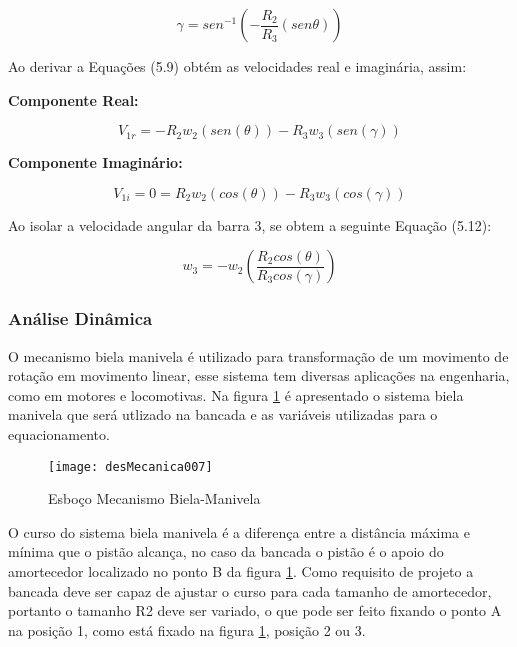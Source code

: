 		\begin{equation}
			\gamma = sen^{-1} ( - \frac{R_{2}}{R_{3}}(sen\theta))
		\end{equation}

		Ao derivar a Equações (5.9) obtém as velocidades real e imaginária, assim:

		\textbf{Componente Real:}

		\begin{equation}
			V_{1r} = -R_{2}w_{2}(sen(\theta)) - R_{3}w_{3}(sen(\gamma))
		\end{equation}

		\textbf{Componente Imaginário:}

		\begin{equation}
			V_{1i} = 0 = R_{2}w_{2}(cos(\theta)) - R_{3}w_{3}(cos(\gamma))
		\end{equation}

		Ao isolar a velocidade angular da barra 3, se obtem a seguinte Equação (5.12):

		\begin{equation}
			w_{3} = - w_{2} (\frac{R_{2}cos(\theta)}{R_{3}cos(\gamma)})
		\end{equation}

	\subsubsection{Análise Dinâmica}

		O mecanismo biela manivela é utilizado para transformação de um movimento de rotação em movimento linear, esse sistema tem diversas aplicações na engenharia, como em motores e locomotivas. Na figura \ref{desMecanica007} é apresentado o sistema biela manivela que será utlizado na bancada e as variáveis utilizadas para o equacionamento.

		\begin{figure}[h]
			\centering
			\texttt{[image: desMecanica007]}
			\caption{Esboço Mecanismo Biela-Manivela}
			\label{desMecanica007}
		\end{figure}

		O curso do sistema biela manivela é a diferença entre a distância máxima e mínima que o pistão alcança, no caso da bancada o pistão é o apoio do amortecedor localizado no ponto B da figura \ref{desMecanica007}. Como requisito de projeto a bancada deve ser capaz de ajustar o curso para cada tamanho de amortecedor, portanto o tamanho R2 deve ser variado, o que pode ser feito fixando o ponto A na posição 1, como está fixado na figura \ref{desMecanica007}, posição 2 ou 3.


